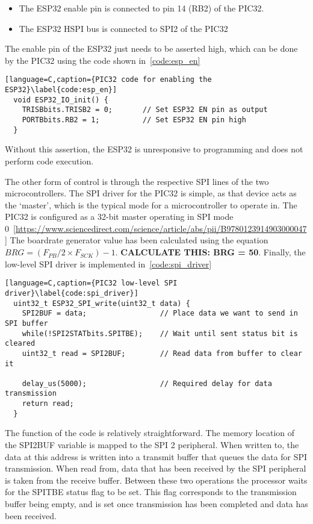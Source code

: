\begin{itemize}
        \item The ESP32 enable pin is connected to pin 14 (RB2) of the PIC32.
        \item The ESP32 HSPI bus is connected to SPI2 of the PIC32
\end{itemize}

The enable pin of the ESP32 just needs to be asserted high, which can be done by the PIC32 using the code shown in~\autoref{code:esp_en}

\begin{lstlisting}[language=C,caption={PIC32 code for enabling the ESP32}\label{code:esp_en}]
  void ESP32_IO_init() {
    TRISBbits.TRISB2 = 0;       // Set ESP32 EN pin as output
    PORTBbits.RB2 = 1;          // Set ESP32 EN pin high
  }
\end{lstlisting}

Without this assertion, the ESP32 is unresponsive to programming and does not perform code execution.

The other form of control is through the respective SPI lines of the two microcontrollers.
The SPI driver for the PIC32 is simple, as that device acts as the `master', which is the typical mode for a microcontroller to operate in.
The PIC32 is configured as a 32-bit master operating in SPI mode 0~\ref{https://www.sciencedirect.com/science/article/abs/pii/B9780123914903000047}
The boardrate generator value has been calculated using the equation \(BRG = (F_{PB} / 2 \times F_{SCK}) - 1\). \textbf{CALCULATE THIS: BRG = 50}.
Finally, the low-level SPI driver is implemented in~\autoref{code:spi_driver}

\begin{lstlisting}[language=C,caption={PIC32 low-level SPI driver}\label{code:spi_driver}]
  uint32_t ESP32_SPI_write(uint32_t data) {
    SPI2BUF = data;                 // Place data we want to send in SPI buffer
    while(!SPI2STATbits.SPITBE);    // Wait until sent status bit is cleared
    uint32_t read = SPI2BUF;        // Read data from buffer to clear it

    delay_us(5000);                 // Required delay for data transmission
    return read;
  }
\end{lstlisting}

The function of the code is relatively straightforward.
The memory location of the SPI2BUF variable is mapped to the SPI 2 peripheral.
When written to, the data at this address is written into a transmit buffer that queues the data for SPI transmission.
When read from, data that has been received by the SPI peripheral is taken from the receive buffer.
Between these two operations the processor waits for the SPITBE status flag to be set.
This flag corresponds to the transmission buffer being empty, and is set once transmission has been completed and data has been received.

